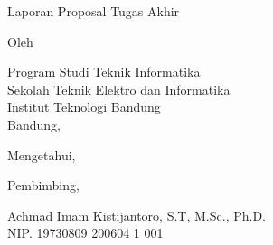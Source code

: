 \clearpage
\pagestyle{empty}

\begin{center}
  \smallskip

  \Large \bfseries \MakeUppercase{\thetitle}
  \vfill

  \Large Laporan Proposal Tugas Akhir
  \vfill

  \large Oleh

  \Large \theauthor

  \large Program Studi Teknik Informatika \\

  \normalsize \normalfont
  Sekolah Teknik Elektro dan Informatika \\
  Institut Teknologi Bandung \\

  \vfill
  \normalsize \normalfont
  Bandung, \tanggalpengesahan

  Mengetahui,

  Pembimbing,

  \vfill
  \underline{Achmad Imam Kistijantoro, S.T, M.Sc., Ph.D.
  } \\
  NIP. 19730809 200604 1 001

\end{center}
\clearpage
